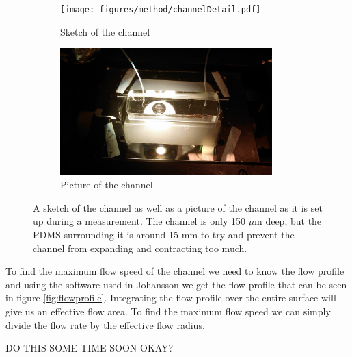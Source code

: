 \begin{figure}[H]
\centering
\begin{subfigure}[b]{0.45\textwidth}
\texttt{[image: figures/method/channelDetail.pdf]}
\caption{Sketch of the channel}\label{fig:channelsketch}
\end{subfigure}
\begin{subfigure}[b]{0.45\textwidth}
\includegraphics[width=0.9\textwidth]{figures/method/ChannelZoomed.jpg}
\caption{Picture of the channel}\label{fig:channelpicture}
\end{subfigure}
\caption{A sketch of the channel as well as a picture of the channel as it is set up during a measurement. The channel is only 150 $\mu$m deep, but the PDMS surrounding it is around 15 mm to try and prevent the channel from expanding and contracting too much.}
\label{fig:channel}
\end{figure}


To find the maximum flow speed of the channel we need to know the flow profile and using the software used in Johansson \cite{AntonThesis} we get the flow profile that can be seen in figure \ref{fig:flowprofile}. Integrating the flow profile over the entire surface will give us an effective flow area. To find the maximum flow speed we can simply divide the flow rate by the effective flow radius.

DO THIS SOME TIME SOON OKAY?










